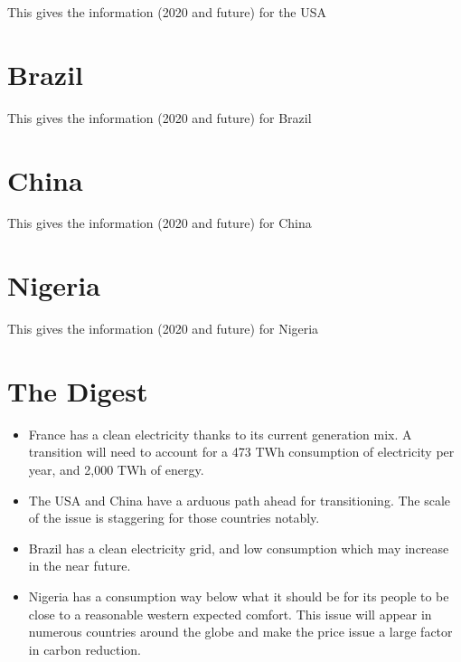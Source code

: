 This gives the information (2020 and future) for the USA

\section{Brazil}

This gives the information (2020 and future) for Brazil

\section{China}

This gives the information (2020 and future) for China

\section{Nigeria}

This gives the information (2020 and future) for Nigeria


\section{The Digest}


\begin{kaoboxgreen}[frametitle=Main Takeaways]

\begin{itemize}
\item France has a clean electricity thanks to its current generation mix. A transition will need to account for a 473 TWh consumption of electricity per year, and 2,000 TWh of energy.
\item The USA and China have a arduous path ahead for transitioning. The scale of the issue is staggering for those countries notably.
\item Brazil has a clean electricity grid, and low consumption which may increase in the near future.
\item Nigeria has a consumption way below what it should be for its people to be close to a reasonable western expected comfort. This issue will appear in numerous countries around the globe and make the price issue a large factor in carbon reduction.
\end{itemize}
  
\end{kaoboxgreen}